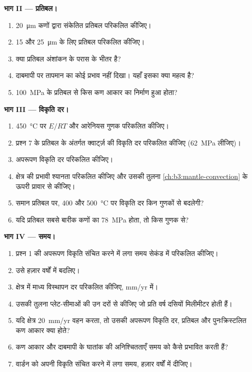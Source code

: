 \begin{problem}
\medskip\noindent\textbf{भाग II --- प्रतिबल।}
\begin{enumerate}[resume]
  \item \qty{20}{\micro m} कणों द्वारा संकेतित प्रतिबल परिकलित कीजिए।
  \item 15 और \qty{25}{\micro m} के लिए प्रतिबल परिकलित कीजिए।
  \item क्या प्रतिबल अंशांकन के परास के भीतर है?
  \item दाबमापी पर तापमान का कोई प्रभाव नहीं दिखा।
        यहाँ इसका क्या महत्व है?
  \item \qty{100}{MPa} के प्रतिबल से किस कण आकार का निर्माण हुआ होता?
\end{enumerate}

\medskip\noindent\textbf{भाग III --- विकृति दर।}
\begin{enumerate}[resume]
  \item \qty{450}{\celsius} पर $E/RT$ और आरेनियस गुणक परिकलित कीजिए।
  \item प्रश्न 7 के प्रतिबल के अंतर्गत क्वार्ट्ज़ की विकृति दर परिकलित कीजिए
        (\qty{62}{MPa} लीजिए)।
  \item अपरूपण विकृति दर परिकलित कीजिए।
  \item क्षेत्र की प्रभावी श्यानता परिकलित कीजिए और उसकी तुलना
        \cref{ch:b3:mantle-convection} के ऊपरी प्रावार से कीजिए।
  \item समान प्रतिबल पर, 400 और
        \qty{500}{\celsius} पर विकृति दर किन गुणकों से बदलेगी?
  \item यदि प्रतिबल सबसे बारीक कणों का
        \qty{78}{MPa} होता, तो किस गुणक से?
\end{enumerate}

\medskip\noindent\textbf{भाग IV --- समय।}
\begin{enumerate}[resume]
  \item प्रश्न 1 की अपरूपण विकृति संचित करने में लगा समय
        सेकंड में परिकलित कीजिए।
  \item उसे हज़ार वर्षों में बदलिए।
  \item क्षेत्र में माध्य विस्थापन दर परिकलित कीजिए, \unit{mm/yr} में।
  \item उसकी तुलना प्लेट-सीमाओं की उन दरों से कीजिए जो प्रति वर्ष दसियों मिलीमीटर होती हैं।
  \item यदि क्षेत्र \qty{20}{mm/yr} वहन करता, तो उसकी अपरूपण विकृति दर, प्रतिबल
        और पुनःक्रिस्टलित कण आकार क्या होते?
  \item कण आकार और दाबमापी के घातांक की अनिश्चितताएँ
        समय को कैसे प्रभावित करती हैं?
  \item वार्डन  को अपनी विकृति संचित करने में लगा समय,
        हज़ार वर्षों में दीजिए।
\end{enumerate}
\end{problem}
